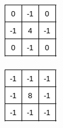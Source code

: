 \begin{figure}[!ht]
     \begin{subfigure}{0.15\linewidth}
         \centering
         \includegraphics[trim={0 4 4 0},clip,width=\textwidth]{Chapters/chapter2/figs/Laplacian_std1.png}
         \caption{}
         \label{fig:Laplacian_std1}
     \end{subfigure}
     \hfill
     \begin{subfigure}{0.15\linewidth}
         \centering
         \includegraphics[trim={0 4 4 0},clip,width=\textwidth]{Chapters/chapter2/figs/Laplacian_std2.png}

\end{subfigure}
\end{figure}
